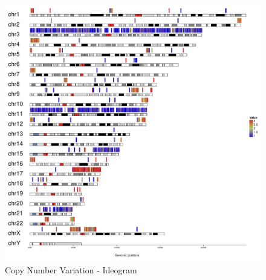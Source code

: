 \documentclass[woside,a4paper,12pt]{article}\usepackage[]{graphicx}\usepackage[]{color}
\begin{document}
\begin{figure}[H]
\centering
\includegraphics[width=\textwidth]{somaticGermline_TCRBOA6_VCRome_CNV_Plot_Ideogram_2019-01-12.pdf}
\caption{Copy Number Variation - Ideogram}
\label{fig:12}
\end{figure}
\end{document}
